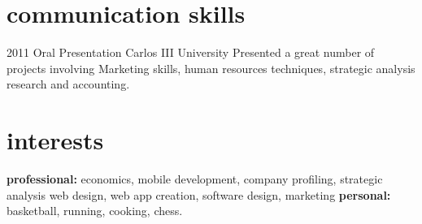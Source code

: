 \documentclass[]{friggeri-cv} %
\begin{document}

\section{communication skills}

\begin{entrylist}
\entry
{2011}
{Oral Presentation}
{Carlos III University}
{Presented a great number of projects involving Marketing skills, human resources techniques, strategic analysis research and accounting.}
\end{entrylist}


\section{interests}

\textbf{professional:} economics, mobile development, company profiling, strategic analysis web design, web app creation, software design, marketing \textbf{personal:} basketball, running, cooking, chess.

\end{document}
